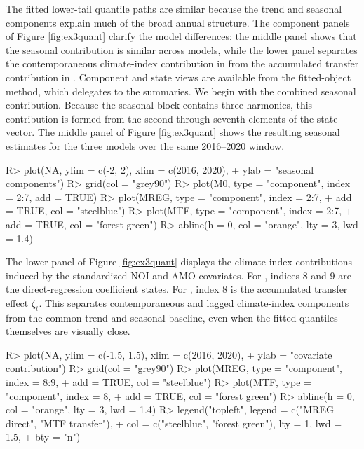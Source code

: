 \documentclass{jss}
\begin{document}
The fitted lower-tail quantile paths are similar because the trend and seasonal components explain
much of the broad annual structure. The component panels of Figure \ref{fig:ex3quant} clarify the model
differences: the middle panel shows that the seasonal contribution is similar
across models, while the lower panel separates the contemporaneous climate-index
contribution in  from the accumulated transfer contribution in
. Component and state views are available from the fitted-object
 method, which delegates to the  summaries. We
begin with the combined seasonal contribution. Because the seasonal block
contains three harmonics, this contribution is formed from the second through
seventh elements of the state vector. The middle panel of Figure
\ref{fig:ex3quant} shows the resulting seasonal estimates for the three models
over the same 2016--2020 window.

\begin{CodeChunk}
\begin{CodeInput}
R> plot(NA, ylim = c(-2, 2), xlim = c(2016, 2020),
+      ylab = "seasonal components")
R> grid(col = "grey90")
R> plot(M0, type = "component", index = 2:7, add = TRUE)
R> plot(MREG, type = "component", index = 2:7,
+       add = TRUE, col = "steelblue")
R> plot(MTF, type = "component", index = 2:7,
+       add = TRUE, col = "forest green")
R> abline(h = 0, col = "orange", lty = 3, lwd = 1.4)
\end{CodeInput}
\end{CodeChunk}
The lower panel of Figure \ref{fig:ex3quant} displays the climate-index
contributions induced by the standardized NOI and AMO covariates. For
, indices 8 and 9 are the direct-regression coefficient states. For
, index 8 is the accumulated transfer effect \(\zeta_t\). This
separates contemporaneous and lagged climate-index components from the common
trend and seasonal baseline, even when the fitted quantiles themselves are
visually close.

\begin{CodeChunk}
\begin{CodeInput}
R> plot(NA, ylim = c(-1.5, 1.5), xlim = c(2016, 2020),
+      ylab = "covariate contribution")
R> grid(col = "grey90")
R> plot(MREG, type = "component", index = 8:9,
+       add = TRUE, col = "steelblue")
R> plot(MTF, type = "component", index = 8,
+       add = TRUE, col = "forest green")
R> abline(h = 0, col = "orange", lty = 3, lwd = 1.4)
R> legend("topleft", legend = c("MREG direct", "MTF transfer"),
+        col = c("steelblue", "forest green"), lty = 1, lwd = 1.5,
+        bty = "n")
\end{CodeInput}
\end{CodeChunk}
\end{document}

